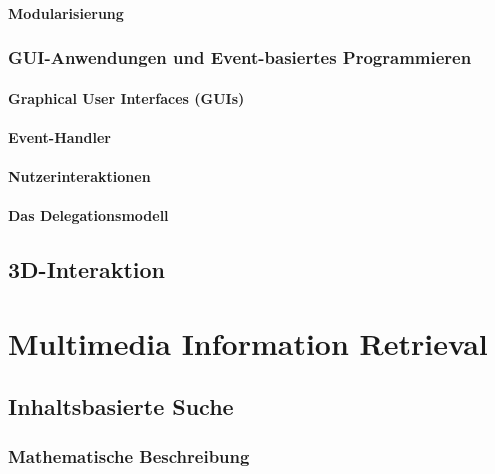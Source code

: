\documentclass[a4paper, 11pt, accentcolor = tud3b]{tudreport}
\begin{document}
				\subsubsection{Modularisierung} %

			\subsection{GUI-Anwendungen und Event-basiertes Programmieren} %

				\subsubsection{Graphical User Interfaces (GUIs)} %

				\subsubsection{Event-Handler} %

				\subsubsection{Nutzerinteraktionen} %

				\subsubsection{Das Delegationsmodell} %

		\section{3D-Interaktion} %

	\chapter{Multimedia Information Retrieval} %

		\section{Inhaltsbasierte Suche} %

			\subsection{Mathematische Beschreibung} %
\end{document}
